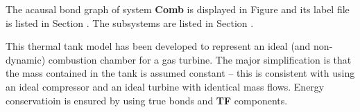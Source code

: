 

   The acausal bond graph of system \textbf{Comb} is
   displayed in Figure  and its label
   file is listed in Section .
   The subsystems are listed in Section .
   
   This thermal tank model has been developed to represent an ideal
   (and non-dynamic) combustion chamber for a gas turbine. The major
   simplification is that the mass contained in the tank is assumed
   constant -- this is consistent with using an ideal compressor and an
   ideal turbine with identical mass flows. Energy conservatioin is
   ensured by using true bonds and \textbf{TF} components.

